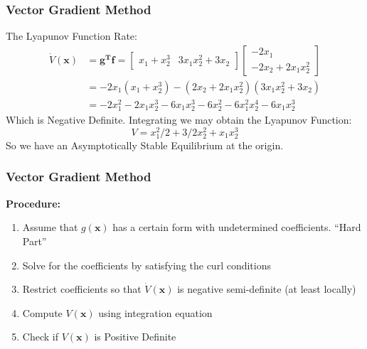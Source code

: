 \documentclass[11pt,handout]{beamer}   %
\begin{document}
\begin{frame}
\frametitle{Vector Gradient Method}
The Lyapunov Function Rate:\\
\begin{equation*}
\begin{split}
\dot{V}(\mathbf{x}) &= \mathbf{g^Tf} = \begin{bmatrix}
x_1 + x_2^3 & 3 x_1x_2^2 + 3x_2
\end{bmatrix}\begin{bmatrix}
-2x_1\\ -2x_2 + 2x_1x_2^2
\end{bmatrix}\\
&= -2x_1(x_1+x_2^3) - (2x_2+2x_1x_2^2)(3x_1x_2^2 + 3x_2)\\
&= -2x_1^2 -2x_1x_2^3 - 6x_1x_2^3 - 6x_2^2 - 6x_1^2x_2^4 - 6x_1x_2^3
\end{split}
\end{equation*}
Which is Negative Definite. Integrating we may obtain the Lyapunov Function:
\begin{equation*}
V = x_1^2/2 + 3/2 x_2^2 + x_1 x_2^3
\end{equation*}
So we have an Asymptotically Stable Equilibrium at the origin.
\end{frame}

\begin{frame}
\frametitle{Vector Gradient Method}
\textbf{Procedure:}
\begin{enumerate}
\item Assume that $g(\mathbf{x})$ has a certain form with undetermined coefficients. ``Hard Part''
\item Solve for the coefficients by satisfying the curl conditions
\item Restrict coefficients so that $\dot{V}(\mathbf{x})$ is negative semi-definite (at least locally)
\item Compute $V(\mathbf{x})$ using integration equation
\item Check if $V(\mathbf{x})$ is Positive Definite
\end{enumerate}
\end{frame}
\end{document}

